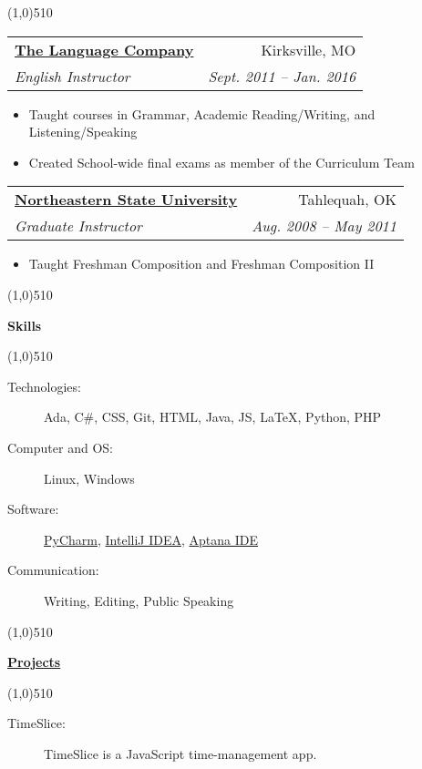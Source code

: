 \documentclass[letterpaper,11pt]{article}
\makeatletter
\newcommand{\resitem}[1]{\item #1 \vspace{-2pt}}
\newcommand{\resheading}[1]{{\large {\begin{minipage}{\textwidth}{\textbf{#1 \vphantom{p\^{E}}}}\end{minipage}}}}
\newcommand{\ressubheading}[4]{
\begin{tabular*}{6.5in}{l@{\extracolsep{\fill}}r}
		\textbf{#1} & #2 \\
		\textit{#3} & \textit{#4} \\
\end{tabular*}\vspace{-6pt}}
\makeatother
\begin{document}
\line(1,0){510}
	\begin{description}

		\item 
			\ressubheading{\href{http://www.thelanguagecompany.com}{The Language Company }}{Kirksville, MO}
				{English Instructor}{ \footnotesize{Sept. 2011 -- Jan. 2016}}
				{ \footnotesize
				\begin{itemize}
					\resitem{Taught courses in Grammar, Academic Reading/Writing, and Listening/Speaking}
					\resitem{Created School-wide final exams as member of the Curriculum Team}
				\end{itemize}
				}
		\item
			\ressubheading{\href{http://www.nsuok.edu}{Northeastern State University}}{Tahlequah, OK}
				{Graduate Instructor}{ \footnotesize{Aug. 2008 -- May 2011}}
				{ \footnotesize
				\begin{itemize}
					\resitem{Taught Freshman Composition and Freshman Composition II}
				\end{itemize}
				}

	\end{description}  %

\line(1,0){510}

\resheading{Skills}

\line(1,0){510}

	\begin{description}
		\item  [Technologies:] { \footnotesize 
			Ada, C\#, CSS, Git, HTML, Java, JS, LaTeX, Python, PHP  
		}
		\item[Computer and OS:] { \footnotesize
			Linux, Windows
		}
		
		\item[Software:]{\footnotesize \href{http://www.jetbrains.com/pycharm/}{PyCharm},
		\href{http://www.jetbrains.com/idea/}{IntelliJ IDEA},
		\href{http://www.aptana.com/}{Aptana IDE}

} 
		\item[Communication:] { \footnotesize
			Writing, Editing, Public Speaking
		}

	\end{description} %

\line(1,0){510}

\resheading{\href{https://github.com/nicholaslgoodman}{Projects}}

\line(1,0){510}

\begin{description}
\item[TimeSlice:] { \footnotesize TimeSlice is a JavaScript time-management app.}

\end{description}
\end{document}

